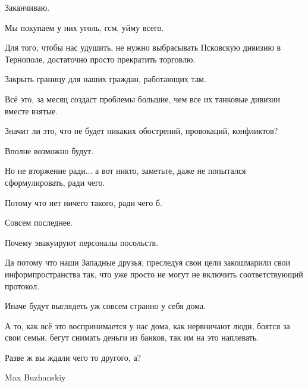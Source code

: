 Заканчиваю.

Мы покупаем у них уголь, гсм, уйму всего.

Для того, чтобы нас удушить, не нужно выбрасывать Псковскую дивизию в
Тернополе, достаточно просто прекратить торговлю.

Закрыть границу для наших граждан, работающих там.

Всё это, за месяц создаст проблемы большие, чем все их танковые дивизии вместе
взятые.

Значит ли это, что не будет никаких обострений, провокаций, конфликтов?

Вполне возможно будут.

Но не вторжение ради... а вот никто, заметьте, даже не попытался
сформулировать, ради чего.

Потому что нет ничего такого, ради чего б.

Совсем последнее.

Почему эвакуируют персоналы посольств.

Да потому что наши Западные друзья, преследуя свои цели закошмарили свои
информпространства так, что уже просто не могут не включить соответствующий
протокол.

Иначе будут выглядеть уж совсем странно у себя дома.

А то, как всё это воспринимается у нас дома, как нервничают люди, боятся за
свои семьи, бегут снимать деньги из банков, так им на это наплевать.

Разве ж вы ждали чего то другого, а?

Max Buzhanskiy

